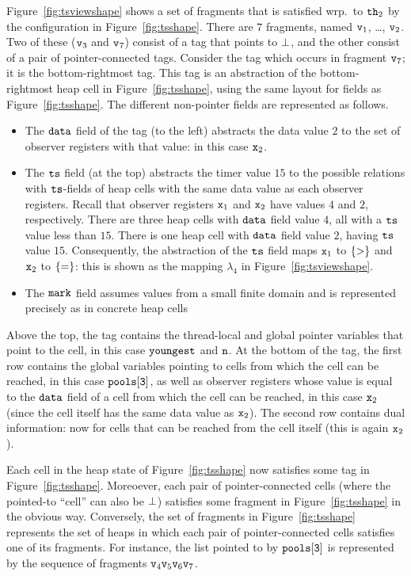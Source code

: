 Figure~\ref{fig:tsviewshape} shows a set of fragments that is
satisfied wrp.\ to ${\tt th}_2$ by the configuration in Figure~\ref{fig:tsshape}.
There are $7$ fragments, named $\mathtt{v}_1$, \ldots , $\mathtt{v}_2$. Two of
these ($\mathtt{v}_3$ and $\mathtt{v}_7$) consist of a tag that points to $\bot$,
and the other consist of a pair of pointer-connected tags.
Consider the tag which occurs in fragment $\mathtt{v}_7$; it is the bottom-rightmost
tag. This tag is an abstraction of the
bottom-rightmost heap cell in Figure~\ref{fig:tsshape}, using the same layout
for fields as Figure~\ref{fig:tsshape}. The different non-pointer fields
are represented as follows.
\begin{itemize}
\item The $\tt data$ field of the tag (to the left) abstracts the data value
  $2$ to the set of observer registers with that value: in this case
  $\mathtt{x}_2$.
\item The $\tt ts$ field (at the top) abstracts the timer value $15$ to
  the possible relations with $\tt ts$-fields of heap cells with the same
  data value as each observer registers. Recall that observer registers
  $\mathtt{x}_1$ and $\mathtt{x}_2$ have values $4$ and $2$, respectively. There are
  three heap cells with $\tt data$ field value $4$, all with a $\tt ts$
  value less than $15$. There is one heap cell with
  $\tt data$ field value $2$, having $\tt ts$ value $15$.
  Consequently, the abstraction of the $\tt ts$ field maps $\mathtt{x}_1$ to
  $\left\{>\right\}$ and $\mathtt{x}_2$ to $\left\{=\right\}$: this is shown as the mapping
  $\lambda_4$ in Figure~\ref{fig:tsviewshape}.
\item The $\tt mark$ field assumes values from a small finite domain and
  is represented precisely as in concrete heap cells
\end{itemize}
Above the top, the tag contains the thread-local and global pointer variables
that point to the cell, in this case $\tt youngest$ and $\tt n$.
At the bottom of the tag, the first row contains the global variables 
pointing to cells from which the cell can be reached, in this case
$\tt pools[3]$, as well as observer registers whose value is equal to the
${\tt data}$ field of a cell from which  the cell can be reached, in this
case $\mathtt{x}_2$ (since the cell itself has the same data value as $\mathtt{x}_2$).
The second row contains dual information: now for cells that can be reached
from the cell itself (this is again $\mathtt{x}_2$).


Each cell in the heap state of Figure~\ref{fig:tsshape} now satisfies
some tag in Figure~\ref{fig:tsshape}. Moreoever, each pair of pointer-connected
cells (where the pointed-to ``cell'' can also be $\bot$)
satisfies some fragment in Figure~\ref{fig:tsshape} in the obvious way.
Conversely, the set of fragments in
Figure~\ref{fig:tsshape} represents the set of heaps in which each pair of
pointer-connected cells satisfies one of its fragments. For instance, the
list pointed to by $\tt pools[3]$ is represented by the sequence of
fragments $\mathtt{v}_4 \mathtt{v}_5 \mathtt{v}_6 \mathtt{v}_7$.

